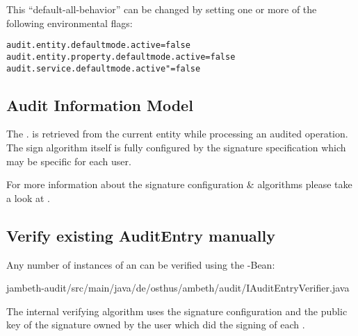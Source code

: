 This ``default-all-behavior'' can be changed by setting one or more of the following environmental flags:
\begin{lstlisting}[style=Props]
audit.entity.defaultmode.active=false
audit.entity.property.defaultmode.active=false
audit.service.defaultmode.active"=false
\end{lstlisting}

\subsection{Audit Information Model}

\def\showimgref{img/gen/2014-10-04-DeK-Ambeth-Audit-3}

The . is retrieved from the current  entity while processing an audited operation. The sign algorithm itself is fully configured by the signature specification which may be specific for each user.


\def\showimgref{img/gen/2014-10-04-DeK-Ambeth-Audit-4}

For more information about the signature configuration \& algorithms please take a look at .

\subsection{Verify existing AuditEntry manually}
Any number of instances of an  can be verified using the -Bean:

	{jambeth-audit/src/main/java/de/osthus/ambeth/audit/IAuditEntryVerifier.java}

The internal verifying algorithm uses the signature configuration and the public key of the signature owned by the user which did the signing of each .

